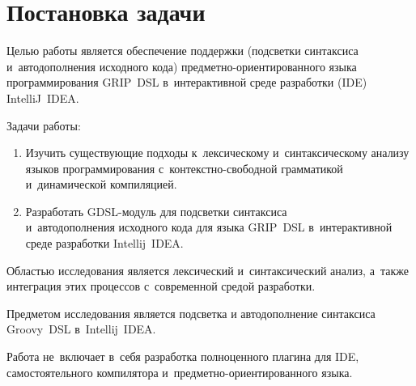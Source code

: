 \section{Постановка задачи} \label{sub21}

Целью работы является обеспечение поддержки (подсветки синтаксиса и~автодополнения исходного кода) предметно-ориентированного языка программирования GRIP~DSL в~интерактивной среде разработки (IDE) IntelliJ~IDEA.

Задачи работы: 

\begin{enumerate} 
\item{Изучить существующие подходы к~лексическому и~синтаксическому анализу языков программирования с~контекстно-свободной грамматикой и~динамической компиляцией.}	
\item{Разработать GDSL-модуль для подсветки синтаксиса \\ и~автодополнения исходного кода для языка GRIP~DSL в~интерактивной среде разработки Intellij~IDEA.}
\end{enumerate} 

Областью исследования является лексический и~синтаксический анализ, а~также интеграция этих процессов с~современной средой разработки.

Предметом исследования является подсветка и автодополнение синтаксиса Groovy~DSL в~Intellij~IDEA. 

Работа не~включает в~себя разработка полноценного плагина для IDE, самостоятельного компилятора и~предметно-ориентированного языка.
